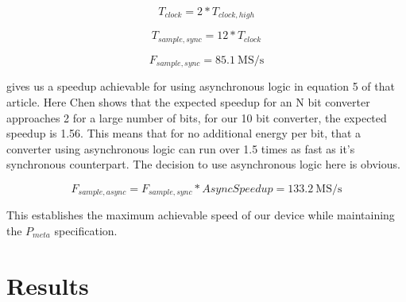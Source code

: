 \documentclass[10pt,journal]{IEEEtran}\usepackage{longtable}
\begin{document}
\begin{equation}
  T_{clock} = 2 * T_{clock,high}
\end{equation}

\begin{equation}
  T_{sample,sync} = 12 * T_{clock}
\end{equation}

\begin{equation}
  F_{sample,sync} = \SI{85.1}{\mega\siemens\per\second}
\end{equation}

\cite{Chen:2006} gives us a speedup achievable for using asynchronous logic in equation 5 of that article. Here Chen shows that the expected speedup for an N bit converter approaches 2 for a large number of bits, for our 10 bit converter, the expected speedup is 1.56.
This means that for no additional energy per bit, that a converter using asynchronous logic can run over 1.5 times as fast as it's synchronous counterpart. The decision to use asynchronous logic here is obvious.

\begin{equation}
  F_{sample,async} = F_{sample,sync} * AsyncSpeedup = \SI{133.2}{\mega\siemens\per\second}
\end{equation}

This establishes the maximum achievable speed of our device while maintaining the $P_{meta}$ specification.



\section{Results}
\end{document}
